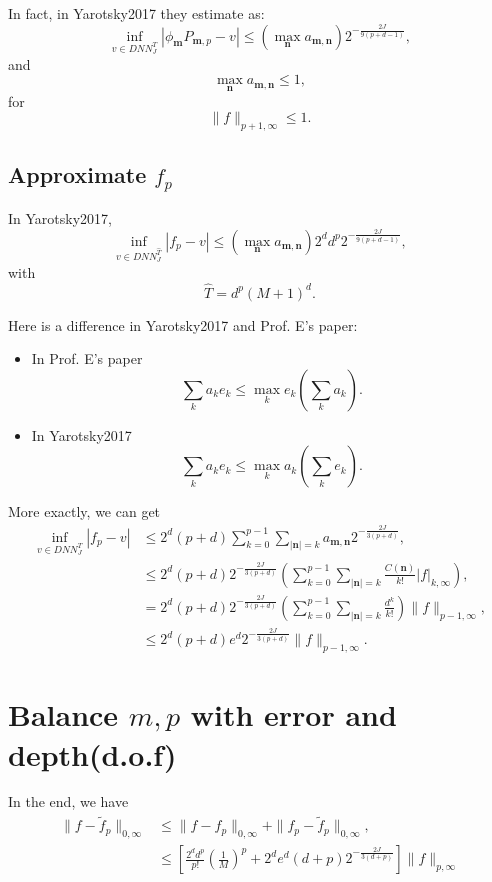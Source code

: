 \begin{remark}
In fact, in Yarotsky2017 they estimate as:
$$
\inf_{v \in DNN^{T}_{J}} |\phi_{\bm m} P_{\bm m, p} - v| \le (\max_{ \bm n} a_{\bm m,\bm n}) 2^{-\frac{2J}{9(p + d -1)}},
$$	
and 
$$
\max_{ \bm n} a_{\bm m,\bm n} \le 1,
$$
for 
$$
\|f\|_{p+1,\infty} \le 1.
$$
\end{remark}


\subsection{Approximate $f_p$}
In Yarotsky2017, 
$$
\inf_{v \in DNN^{\hat T}_{J}} |f_p - v| \le (\max_{ \bm n} a_{\bm m,\bm n}) 2^d d^p2^{-\frac{2J}{9(p + d -1)}},
$$
with 
$$
\hat T = d^p (M+1)^d.
$$

\begin{remark}
	Here is a difference in Yarotsky2017 and Prof. E's paper: 
	\begin{itemize}
		\item In Prof. E's paper
		$$
		\sum_{k} a_k e_k \le \max_k e_k (\sum_k a_k).
		$$
		\item In Yarotsky2017
		$$
		\sum_{k} a_k e_k \le \max_k a_k (\sum_k e_k).
		$$
	\end{itemize}
\end{remark}
More exactly, we can get
\begin{align}
\inf_{v \in DNN^{T}_{J}} |f_p - v| &\le  2^d (p+d) \sum_{k=0}^{p-1}\sum_{|\bm n|=k} a_{\bm m, \bm n}2^{-\frac{2J}{3(p + d )}}, \\
&\le  2^d (p+d) 2^{-\frac{2J}{3(p + d )}} \left(\sum_{k=0}^{p-1}\sum_{|\bm n|=k} \frac{C(\bm n)}{k!} |f|_{k,\infty}\right), \\
&= 2^d (p+d) 2^{-\frac{2J}{3(p + d )}} \left(\sum_{k=0}^{p-1}\sum_{|\bm n|=k} \frac{d^k}{k!} \right)\|f\|_{p-1,\infty}, \\
&\le  2^d (p+d) e^d 2^{-\frac{2J}{3(p + d )}}\|f\|_{p-1,\infty}. 
\end{align}


\section{Balance $m, p$ with error and depth(d.o.f)}
In the end, we have
\begin{align}
\|f- \tilde f_p\|_{0,\infty} &\le \|f - f_p\|_{0,\infty} + \|f_p - \tilde f_p\|_{0,\infty}, \\
&\le \left[ \frac{2^dd^p}{p!}(\frac{1}{M})^p + 2^d e^d (d+p) 2^{-\frac{2J}{3(d+p)}}\right] \|f\|_{p, \infty}
\end{align}

